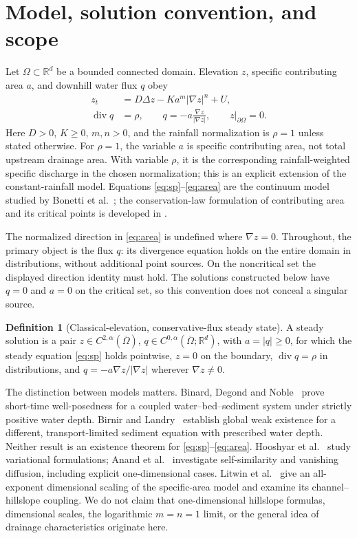 \documentclass[11pt,a4paper]{article}
\theoremstyle{definition}\newtheorem{definition}[theorem]{Definition}
\theoremstyle{remark}\newtheorem{remark}[theorem]{Remark}
\newcommand{\R}{\mathbb R}\newcommand{\divg}{\operatorname{div}}
\newcommand{\cl}{\overline}
\begin{document}
\section{Model, solution convention, and scope}
Let $\Omega\subset\R^d$ be a bounded connected domain. Elevation $z$, specific contributing area $a$, and downhill water flux $q$ obey
\begin{align}
 z_t&=D\Delta z-Ka^m|\nabla z|^n+U,\label{eq:sp}\\
 \divg q&=\rho,\qquad q=-a\frac{\nabla z}{|\nabla z|},\qquad z|_{\partial\Omega}=0.\label{eq:area}
\end{align}
Here $D>0$, $K\geq0$, $m,n>0$, and the rainfall normalization is $\rho=1$ unless stated otherwise. For $\rho=1$, the variable $a$ is specific contributing area, not total upstream drainage area. With variable $\rho$, it is the corresponding rainfall-weighted specific discharge in the chosen normalization; this is an explicit extension of the constant-rainfall model. Equations \eqref{eq:sp}--\eqref{eq:area} are the continuum model studied by Bonetti et al.\ \cite{Bonetti2020}; the conservation-law formulation of contributing area and its critical points is developed in \cite{Bonetti2018}.

The normalized direction in \eqref{eq:area} is undefined where $\nabla z=0$. Throughout, the primary object is the flux $q$: its divergence equation holds on the entire domain in distributions, without additional point sources. On the noncritical set the displayed direction identity must hold. The solutions constructed below have $q=0$ and $a=0$ on the critical set, so this convention does not conceal a singular source.

\begin{definition}[Classical-elevation, conservative-flux steady state]
A steady solution is a pair $z\in C^{2,\alpha}(\cl\Omega)$, $q\in C^{0,\alpha}(\cl\Omega;\R^d)$, with $a=|q|\geq0$, for which the steady equation \eqref{eq:sp} holds pointwise, $z=0$ on the boundary, $\divg q=\rho$ in distributions, and $q=-a\nabla z/|\nabla z|$ wherever $\nabla z\ne0$.
\end{definition}

The distinction between models matters. Binard, Degond and Noble\ \cite{BDN2024} prove short-time well-posedness for a coupled water--bed--sediment system under strictly positive water depth. Birnir and Landry\ \cite{Birnir2025} establish global weak existence for a different, transport-limited sediment equation with prescribed water depth. Neither result is an existence theorem for \eqref{eq:sp}--\eqref{eq:area}. Hooshyar et al.\ \cite{Hooshyar2020} study variational formulations; Anand et al.\ \cite{Anand2023} investigate self-similarity and vanishing diffusion, including explicit one-dimensional cases. Litwin et al.\ \cite{Litwin2025} give an all-exponent dimensional scaling of the specific-area model and examine its channel--hillslope coupling. We do not claim that one-dimensional hillslope formulas, dimensional scales, the logarithmic $m=n=1$ limit, or the general idea of drainage characteristics originate here.
\end{document}
